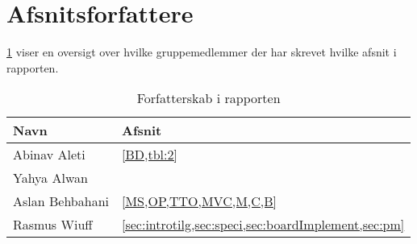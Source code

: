 \appendix
\appendixpage
\addappheadtotoc
\section{Afsnitsforfattere}\label{sec:arbejde}
\cref{tbl:arbejde} viser en oversigt over hvilke gruppemedlemmer der har skrevet hvilke afsnit i rapporten.
\begin{table}[H]
    \centering
    \caption{Forfatterskab i rapporten}\label{tbl:arbejde}
    \begin{tabular}{ll}
        \toprule
        Navn            & Afsnit                                                   \\
        \midrule
        Abinav Aleti    & \cref{BD,tbl:2}                                                \\
        \midrule
        Yahya Alwan     &                                                          \\
        \midrule
        Aslan Behbahani & \cref{MS,OP,TTO,MVC,M,C,B}                               \\
        \midrule
        Rasmus Wiuff    & \cref{sec:introtilg,sec:speci,sec:boardImplement,sec:pm} \\
        \bottomrule
    \end{tabular}
\end{table}